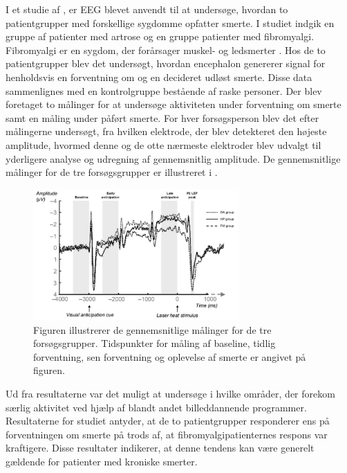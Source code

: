 I et studie af , er EEG blevet anvendt til at undersøge, hvordan to patientgrupper med forskellige sygdomme opfatter smerte. I studiet indgik en gruppe af patienter med artrose og en gruppe patienter med fibromyalgi. Fibromyalgi er en sygdom, der forårsager muskel- og ledsmerter \citep{Gigtforeningen2016}. Hos de to patientgrupper blev det undersøgt, hvordan encephalon genererer signal for henholdsvis en forventning om og en decideret udløst smerte. Disse data sammenlignes med en kontrolgruppe bestående af raske personer. Der blev foretaget to målinger for at undersøge aktiviteten under forventning om smerte samt en måling under påført smerte. For hver forsøgsperson blev det efter målingerne undersøgt, fra hvilken elektrode, der blev detekteret den højeste amplitude, hvormed denne og de otte nærmeste elektroder blev udvalgt til yderligere analyse og udregning af gennemsnitlig amplitude. De gennemsnitlige målinger for de tre forsøgsgrupper er illustreret i .
\begin{figure}[H] 
	\begin{center}
		\includegraphics[width=0.7\textwidth]{figures/bProblemanalyse/EEG_ERP}
	\end{center}
	\caption{Figuren illustrerer de gennemsnitlige målinger for de tre forsøgsgrupper. Tidspunkter for måling af baseline, tidlig forventning, sen forventning og oplevelse af smerte er angivet på figuren. \citep{Brown2013}} 
	\label{fig:EEG_gns} 
\end{figure} 

Ud fra resultaterne var det muligt at undersøge i hvilke områder, der forekom særlig aktivitet ved hjælp af blandt andet billeddannende programmer. Resultaterne for studiet antyder, at de to patientgrupper responderer ens på forventningen om smerte på trods af, at fibromyalgipatienternes respons var kraftigere. Disse resultater indikerer, at denne tendens kan være generelt gældende for patienter med kroniske smerter. \citep{Brown2013} 

